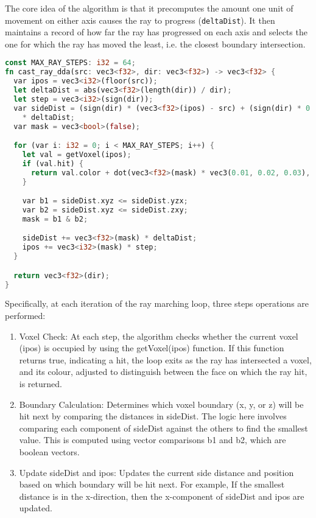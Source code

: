 The core idea of the algorithm is that it precomputes the amount one unit of movement on either axis causes the ray to progress (\texttt{deltaDist}). It then maintains a record of how far the ray has progressed on each axis and selects the one for which the ray has moved the least, i.e. the closest boundary intersection.

\begin{lstlisting}[language=rust, captionpos=b, caption={\texttt{DDA} algorithm}]
const MAX_RAY_STEPS: i32 = 64;
fn cast_ray_dda(src: vec3<f32>, dir: vec3<f32>) -> vec3<f32> {
  var ipos = vec3<i32>(floor(src));
  let deltaDist = abs(vec3<f32>(length(dir)) / dir);
  let step = vec3<i32>(sign(dir));
  var sideDist = (sign(dir) * (vec3<f32>(ipos) - src) + (sign(dir) * 0.5) + 0.5)
    * deltaDist;
  var mask = vec3<bool>(false);

  for (var i: i32 = 0; i < MAX_RAY_STEPS; i++) {
    let val = getVoxel(ipos);
    if (val.hit) {
      return val.color + dot(vec3<f32>(mask) * vec3(0.01, 0.02, 0.03), vec3(1.0));
    }

    var b1 = sideDist.xyz <= sideDist.yzx;
    var b2 = sideDist.xyz <= sideDist.zxy;
    mask = b1 & b2;

    sideDist += vec3<f32>(mask) * deltaDist;
    ipos += vec3<i32>(mask) * step;
  }

  return vec3<f32>(dir);
}
\end{lstlisting}

Specifically, at each iteration of the ray marching loop, three steps operations are performed:
\begin{enumerate}
  \item Voxel Check: At each step, the algorithm checks whether the current voxel (ipos) is occupied by using the getVoxel(ipos) function. If this function returns true, indicating a hit, the loop exits as the ray has intersected a voxel, and its colour, adjusted to distinguish between the face on which the ray hit, is returned.
  \item Boundary Calculation: Determines which voxel boundary (x, y, or z) will be hit next by comparing the distances in sideDist. The logic here involves comparing each component of sideDist against the others to find the smallest value. This is computed using vector comparisons b1 and b2, which are boolean vectors.
  \item Update sideDist and ipos: Updates the current side distance and position based on which boundary will be hit next. For example, If the smallest distance is in the x-direction, then the x-component of sideDist and ipos are updated.
\end{enumerate}


